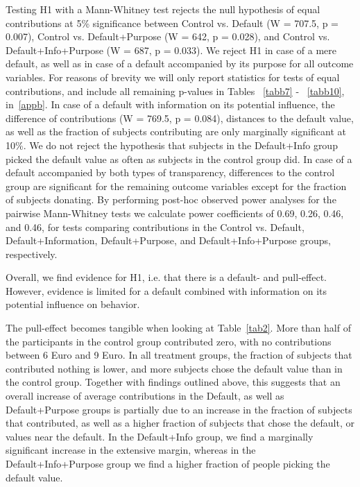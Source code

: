\documentclass[review, authoryear,12pt]{elsarticle}
\begin{document}
Testing H1 with a Mann-Whitney test rejects the null hypothesis of equal contributions at 5\% significance between Control vs. Default (W = 707.5, p = 0.007), Control vs. Default+Purpose (W = 642, p = 0.028), and Control vs. Default+Info+Purpose (W = 687, p = 0.033). We reject H1 in case of a mere default, as well as in case of a default accompanied by its purpose for all outcome variables. For reasons of brevity we will only report statistics for tests of equal contributions, and include all remaining p-values in Tables ~\ref{tabb7} - ~\ref{tabb10}, in~\ref{appb}. In case of a default with information on its potential influence, the difference of contributions (W = 769.5, p = 0.084), distances to the default value, as well as the fraction of subjects contributing are only marginally significant at 10\%. We do not reject the hypothesis that subjects in the Default+Info group picked the default value as often as subjects in the control group did. In case of a default accompanied by both types of transparency, differences to the control group are significant for the remaining outcome variables except for the fraction of subjects donating.
By performing post-hoc observed power analyses for the pairwise Mann-Whitney tests we calculate power coefficients of 0.69, 0.26, 0.46, and 0.46, for tests comparing contributions in the Control vs. Default, Default+Information, Default+Purpose, and Default+Info+Purpose groups, respectively.

Overall, we find evidence for H1, i.e. that there is a default- and pull-effect. However, evidence is limited for a default combined with information on its potential influence on behavior.

The pull-effect becomes tangible when looking at Table~\ref{tab2}. More than half of the participants in the control group contributed zero, with no contributions between 6 Euro and 9 Euro. In all treatment groups, the fraction of subjects that contributed nothing is lower, and more subjects chose the default value than in the control group. Together with findings outlined above, this suggests that an overall increase of average contributions in the Default, as well as Default+Purpose groups is partially due to an increase in the fraction of subjects that contributed, as well as a higher fraction of subjects that chose the default, or values near the default. In the Default+Info group, we find a marginally significant increase in the extensive margin, whereas in the Default+Info+Purpose group we find a higher fraction of people picking the default value.
\end{document}
